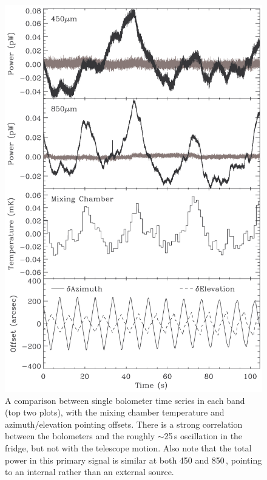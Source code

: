 \documentclass[useAMS,usenatbib,nofootinbib]{mn2e}
\begin{document}
\begin{figure}
\centering
\includegraphics[width=\linewidth]{bolos_point_mix.pdf}
\caption{A comparison between single bolometer time series in each
  band (top two plots), with the mixing chamber temperature and
  azimuth/elevation pointing offsets. There is a strong correlation
  between the bolometers and the roughly $\sim$25\,s oscillation in
  the fridge, but not with the telescope motion. Also note that the
  total power in this primary signal is similar at both 450 and
  850\,\micron, pointing to an internal rather than an external
  source.}
\label{fig:bolos_mix}
\end{figure}
\end{document}
